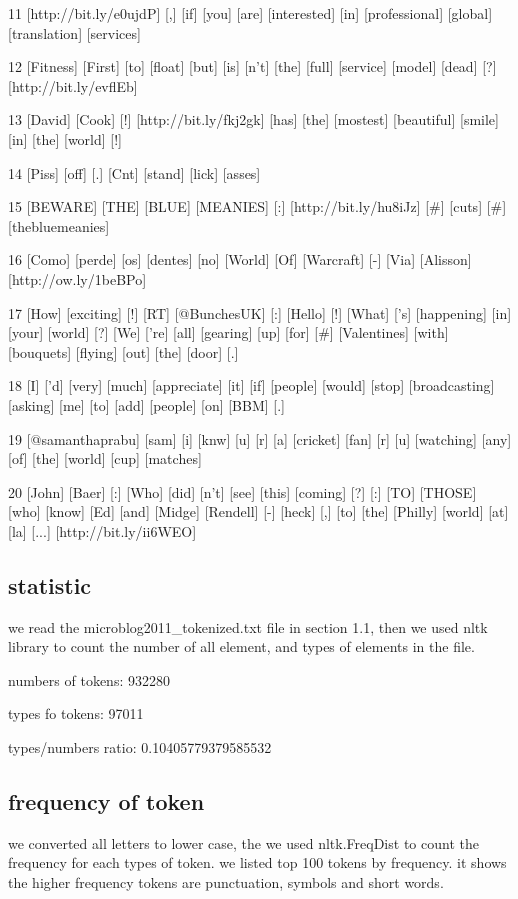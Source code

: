 \documentclass{article}
\begin{document}
\begin{spverbatim}
11 [http://bit.ly/e0ujdP] [,] [if] [you] [are] [interested] [in] [professional] [global] [translation] [services] 

12 [Fitness] [First] [to] [float] [but] [is] [n't] [the] [full] [service] [model] [dead] [?] [http://bit.ly/evflEb] 

13 [David] [Cook] [!] [http://bit.ly/fkj2gk] [has] [the] [mostest] [beautiful] [smile] [in] [the] [world] [!] 

14 [Piss] [off] [.] [Cnt] [stand] [lick] [asses] 

15 [BEWARE] [THE] [BLUE] [MEANIES] [:] [http://bit.ly/hu8iJz] [#] [cuts] [#] [thebluemeanies] 

16 [Como] [perde] [os] [dentes] [no] [World] [Of] [Warcraft] [-] [Via] [Alisson] [http://ow.ly/1beBPo] 

17 [How] [exciting] [!] [RT] [@BunchesUK] [:] [Hello] [!] [What] ['s] [happening] [in] [your] [world] [?] [We] ['re] [all] [gearing] [up] [for] [#] [Valentines] [with] [bouquets] [flying] [out] [the] [door] [.] 

18 [I] ['d] [very] [much] [appreciate] [it] [if] [people] [would] [stop] [broadcasting] [asking] [me] [to] [add] [people] [on] [BBM] [.] 

19 [@samanthaprabu] [sam] [i] [knw] [u] [r] [a] [cricket] [fan] [r] [u] [watching] [any] [of] [the] [world] [cup] [matches] 

20 [John] [Baer] [:] [Who] [did] [n't] [see] [this] [coming] [?] [:] [TO] [THOSE] [who] [know] [Ed] [and] [Midge] [Rendell] [-] [heck] [,] [to] [the] [Philly] [world] [at] [la] [...] [http://bit.ly/ii6WEO]
\end{spverbatim}

\subsection{statistic}
we read the microblog2011\_tokenized.txt file in section 1.1, then we used nltk library to count the number of all element, and types of elements in the file.

numbers of tokens: 932280

types fo tokens: 97011

types/numbers ratio: 0.10405779379585532

\subsection{frequency of token}
we converted all letters to lower case, the we used nltk.FreqDist to count the frequency for each types of token. we listed top 100 tokens by frequency. it shows the higher frequency tokens are punctuation, symbols and short words. \newline
\end{document}
